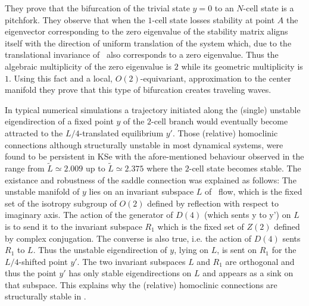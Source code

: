 They prove that the bifurcation of the trivial state $y=0$ to an $N$-cell state is a pitchfork. 
They observe that when the $1$-cell state losses stability at point $A$ the
eigenvector corresponding to the zero eigenvalue of the stability matrix aligns itself with the direction of uniform translation of the
system which, due to the translational invariance of \KSe\, also corresponds to a zero eigenvalue. Thus the algebraic multiplicity of the zero eigenvalue is $2$ while its geometric multiplicity is $1$. Using this fact and a local, $O(2)$-equivariant, approximation to the center manifold they prove that this type of bifurcation creates traveling waves.

In typical numerical simulations  a trajectory initiated along the (single) unstable eigendirection of a
fixed point $y$ of the $2$-cell branch would eventually become attracted to the $L/4$-translated equilibrium $y'$. 
Those (relative) homoclinic connections  although structurally unstable in most dynamical systems, were found to be persistent in KSe with the afore-mentioned behaviour observed in the range  
from $\tilde{L}\simeq 2.009$ up to $\tilde{L}\simeq 2.375$  where the $2$-cell state becomes stable. The existance and
robustness of the saddle connection was explained as follows:  The unstable manifold of $y$ lies on an invariant subspace $L$ of
\KS\ flow, which is the fixed set of the isotropy subgroup of $O(2)$ defined by reflection with respect to imaginary axis. The action of the generator of $D(4)$ (which sents y to y') on $L$ is to send it to the invariant subspace $R_{1}$ which is the fixed set of $Z(2)$ defined by complex
conjugation. The converse is also true, i.e. the action of $D(4)$ sents $R_{1}$ to $L$. Thus the unstable eigendirection of $y$, lying on $L$, is sent on $R_{1}$ for the $L/4$-shifted point $y'$. The two invariant subspaces $L$ and $R_{1}$ are orthogonal and thus the point $y'$ has only stable eigendirections on $L$ and appears as a sink on that subspace. This explains why the (relative) homoclinic connections are structurally stable in \KSe.

